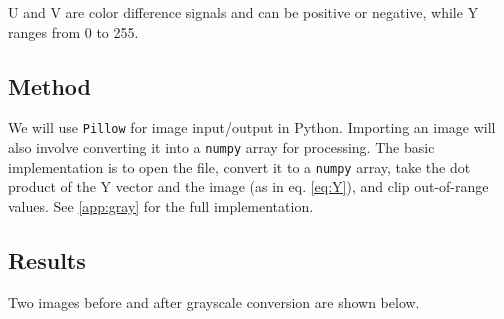 \documentclass[11pt,a4paper]{article}
\begin{document}
U and V are color difference signals and can be positive or negative, while Y ranges from 0 to 255.

\subsection{Method} We will use \verb|Pillow| for image input/output in Python. Importing an image will also involve converting it into a \verb|numpy| array for processing. The basic implementation is to open the file, convert it to a \verb|numpy| array, take the dot product of the Y vector and the image (as in eq. \ref{eq:Y}), and clip out-of-range values. See \ref{app:gray} for the full implementation.

\subsection{Results} Two images before and after grayscale conversion are shown below. 
\end{document}
